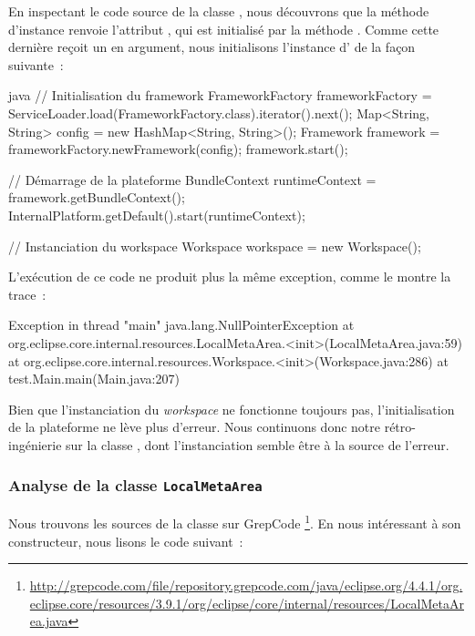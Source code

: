 En inspectant le code source de la classe , nous découvrons que la méthode d'instance  renvoie l'attribut , %
qui est initialisé par la méthode .
Comme cette dernière reçoit un  en argument, nous initialisons l'instance d' de la façon suivante~:

\begin{imtaCode}{java}
// Initialisation du framework
FrameworkFactory frameworkFactory = ServiceLoader.load(FrameworkFactory.class).iterator().next();
Map<String, String> config = new HashMap<String, String>();
Framework framework = frameworkFactory.newFramework(config);
framework.start();

// Démarrage de la plateforme
BundleContext runtimeContext = framework.getBundleContext();
InternalPlatform.getDefault().start(runtimeContext);

// Instanciation du workspace
Workspace workspace = new Workspace();
\end{imtaCode}

L'exécution de ce code ne produit plus la même exception, comme le montre la trace~:

\begin{imtaConsole}
Exception in thread "main" java.lang.NullPointerException
	at org.eclipse.core.internal.resources.LocalMetaArea.<init>(LocalMetaArea.java:59)
	at org.eclipse.core.internal.resources.Workspace.<init>(Workspace.java:286)
	at test.Main.main(Main.java:207)
\end{imtaConsole}

Bien que l'instanciation du \textit{workspace} ne fonctionne toujours pas, l'initialisation de la plateforme ne lève plus d'erreur.
Nous continuons donc notre rétro-ingénierie sur la classe , dont l'instanciation semble être à la source de l'erreur.


\subsubsection{Analyse de la classe \texttt{LocalMetaArea}}

Nous trouvons les sources de la classe  sur GrepCode \footnote{%
\url{http://grepcode.com/file/repository.grepcode.com/java/eclipse.org/4.4.1/org.eclipse.core/resources/3.9.1/org/eclipse/core/internal/resources/LocalMetaArea.java}}.
En nous intéressant à son constructeur, nous lisons le code suivant~:


